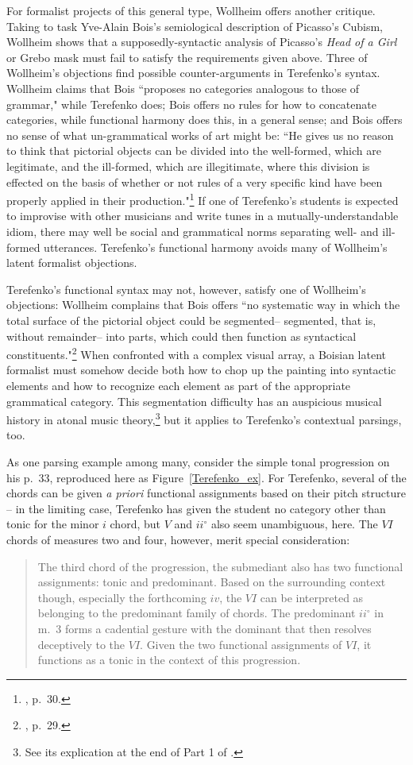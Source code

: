 For formalist projects of this general type, Wollheim offers another critique.  Taking to task Yve-Alain Bois's semiological description of Picasso's Cubism, Wollheim shows that a supposedly-syntactic analysis of Picasso's \emph{Head of a Girl} or Grebo mask must fail to satisfy the requirements given above.  Three of Wollheim's objections find possible counter-arguments in Terefenko's syntax.  Wollheim claims that Bois ``proposes no categories analogous to those of grammar," while Terefenko does; Bois offers no rules for how to concatenate categories, while functional harmony does this, in a general sense; and Bois offers no sense of what un-grammatical works of art might be: ``He gives us no reason to think that pictorial objects can be divided into the well-formed, which are legitimate, and the ill-formed, which are illegitimate, where this division is effected on the basis of whether or not rules of a very specific kind have been properly applied in their production."\footnote{\cite{wollheim1995}, p.\ 30.}  If one of Terefenko's students is expected to improvise with other musicians and write tunes in a mutually-understandable idiom, there may well be social and grammatical norms separating well- and ill-formed utterances.  Terefenko's functional harmony avoids many of Wollheim's latent formalist objections.

Terefenko's functional syntax may not, however, satisfy one of Wollheim's objections:  Wollheim complains that Bois offers ``no systematic way in which the total surface of the pictorial object could be segmented-- segmented, that is, without remainder-- into parts, which could then function as syntactical constituents."\footnote{\cite{wollheim1995}, p.\ 29.}  When confronted with a complex visual array, a Boisian latent formalist must somehow decide both how to chop up the painting into syntactic elements and how to recognize each element as part of the appropriate grammatical category.  This segmentation difficulty has an auspicious musical history in atonal music theory,\footnote{See its explication at the end of Part 1 of \cite{forte1973}.} but it applies to Terefenko's contextual parsings, too.

As one parsing example among many, consider the simple tonal progression on his p.\ 33, reproduced here as Figure~\ref{Terefenko_ex}.  For Terefenko, several of the chords can be given \emph{a priori} functional assignments based on their pitch structure -- in the limiting case, Terefenko has given the student no category other than tonic for the minor $i$ chord, but $V$ and $ii^\circ$ also seem unambiguous, here.  The $VI$ chords of measures two and four, however, merit special consideration:
\begin{quote}
The third chord of the progression, the submediant also has two functional assignments: tonic and predominant.  Based on the surrounding context though, especially the forthcoming $iv$, the $VI$ can be interpreted as belonging to the predominant family of chords.  The predominant $ii^{\circ}$ in m.\ 3 forms a cadential gesture with the dominant that then resolves deceptively to the $VI$.  Given the two functional assignments of $VI$, it functions as a tonic in the context of this progression.
\end{quote}

